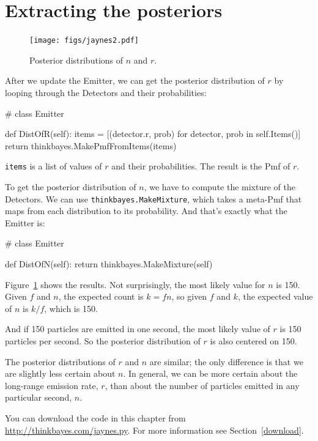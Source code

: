 \documentclass[12pt]{book}
\theoremstyle{exercise}
\begin{document}
\section{Extracting the posteriors}

\begin{figure}
\centerline{\texttt{[image: figs/jaynes2.pdf]}}
\caption{Posterior distributions of $n$ and $r$.}
\label{fig.jaynes2}
\end{figure}

After we update the Emitter, we can get the posterior distribution
of $r$ by looping through the Detectors and their probabilities:

\begin{code}
# class Emitter

    def DistOfR(self):
        items = [(detector.r, prob) for detector, prob in self.Items()]
        return thinkbayes.MakePmfFromItems(items)
\end{code}

{\tt items} is a list of values of $r$ and their probabilities.
The result is the Pmf of $r$.

To get the posterior distribution of $n$, we have to compute
the mixture of the Detectors.  We can use 
{\tt thinkbayes.MakeMixture}, which takes a meta-Pmf that maps
from each distribution to its probability.  And that's exactly
what the Emitter is:

\begin{code}
# class Emitter

    def DistOfN(self):
        return thinkbayes.MakeMixture(self)
\end{code}

Figure~\ref{fig.jaynes2} shows the results.  Not surprisingly, the
most likely value for $n$ is 150.  Given $f$ and $n$, the expected
count is $k = f n$, so given $f$ and $k$, the expected value of $n$ is
$k / f$, which is 150.

And if 150 particles are emitted in one second, the most likely value
of $r$ is 150 particles per second.  So the posterior distribution of
$r$ is also centered on 150.

The posterior distributions of $r$ and $n$ are similar;
the only difference is that we are slightly less certain about $n$.
In general, we can be more certain about the long-range emission rate,
$r$, than about the number of particles emitted in any particular second,
$n$.

You can download the code in this chapter from
\url{http://thinkbayes.com/jaynes.py}.  For more information see
Section~\ref{download}.
\end{document}
